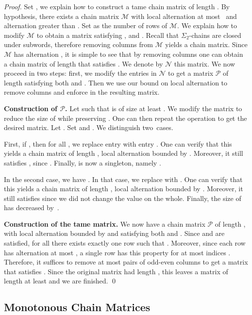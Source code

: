 \documentclass[envcountsame]{llncs}
\newcommand\mat{\ensuremath{\mathscr{M}}\xspace}
\newcommand\mnat{\ensuremath{\mathscr{N}}\xspace}
\newcommand\pat{\ensuremath{\mathscr{P}}\xspace}
\newcommand{\sic}[1]{\ensuremath{\Sigma_{#1}}\xspace}
\newcommand\chain{chain\xspace}
\newcommand\qchains[1]{\ensuremath{\sic{#1}}-chains\xspace}
\newcommand\Chain{Chain\xspace}
\newcommand\dchains{\qchains{2}}
\begin{document}
\begin{proof}
  Set , we explain how to construct a tame \chain matrix of
  length . By hypothesis, there exists a \chain matrix \mat with
  local alternation at most~ and alternation greater than . Set
   as the number of rows of \mat. We explain how to modify \mat to
  obtain a matrix satisfying ,  and . Recall that \dchains
  are closed under subwords, therefore removing columns from \mat yields
  a \chain matrix. Since \mat has alternation , it is simple to see
  that by removing columns one can obtain a \chain matrix of length
   that satisfies . We denote by \mnat this matrix. We now
  proceed in two steps: first, we modify the entries in \mnat to get a
  matrix \pat of length  satisfying both  and . Then we use
  our bound on local alternation to remove columns and enforce  in
  the resulting matrix.

  \medskip
  \noindent
  {\bf Construction of \pat.} Let  such that \alt{\mnat}{j} 
  is of size at least . We modify the matrix to reduce
  the size of \alt{\mnat}{j} while preserving . One can then repeat
  the operation to get the desired matrix. Let .
  Set  and . We distinguish two~cases.

  First, if , then for all ,
  we replace entry  with entry . One can verify
  that this yields a \chain matrix of length , local alternation bounded by
  . Moreover, it still satisfies , since . Finally, \alt{\mnat}{j} is now a singleton, namely .

  In the second case, we have . In that
  case, we replace  with . One can
  verify that this yields a \chain matrix of length , local
  alternation bounded by . Moreover, it still satisfies  since we did not
  change the value on the whole. Finally,
  the size of \alt{\mnat}{j} has decreased by~.

  \medskip
  \noindent
  {\bf Construction of the tame matrix.} We now have a \chain matrix
  \pat of length , with local alternation bounded by  and
  satisfying both  and . Since  and  are satisfied, for
  all  there exists exactly one row  such that
  . Moreover, since each row has
  alternation at most , a single row  has this property for at
  most  indices . Therefore, it suffices to remove at most
   pairs of odd-even columns to get a matrix that satisfies
  . Since the original matrix had length , this leaves a matrix
  of length at least  and we are finished. \qed 
\end{proof}



\subsection{Monotonous \Chain Matrices}
\end{document}
